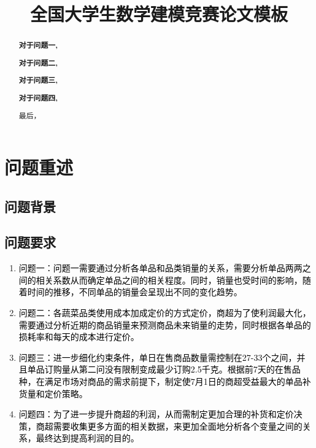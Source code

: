 \documentclass[withoutpreface,bwprint]{cumcmthesis}
\title{全国大学生数学建模竞赛论文模板}  %
\begin{document}
\maketitle
\begin{abstract}
\textbf{对于问题一,}

\textbf{对于问题二,}

\textbf{对于问题三,}

\textbf{对于问题四,}

最后，



\end{abstract}

\tableofcontents  %
\newpage

\section{问题重述}
\subsection{问题背景}
% 

\subsection{问题要求}
\begin{enumerate}
  \item \textcolor{black}{问题一：问题一需要通过分析各单品和品类销量的关系，需要分析单品两两之间的相关系数从而确定单品之间的相关程度。同时，销量也受时间的影响，随着时间的推移，不同单品的销量会呈现出不同的变化趋势。}
  \item \textcolor{black}{问题二：各蔬菜品类使用成本加成定价的方式定价，商超为了使利润最大化，需要通过分析近期的商品销量来预测商品未来销量的走势，同时根据各单品的损耗率和每天的成本进行定价。}
    \item \textcolor{black}{问题三：进一步细化约束条件，单日在售商品数量需控制在27-33个之间，并且单品订购量从第二问没有限制变成最少订购2.5千克。根据前7天的在售品种，在满足市场对商品的需求前提下，制定使7月1日的商超受益最大的单品补货量和定价策略。}
      \item \textcolor{black}{问题四：为了进一步提升商超的利润，从而需制定更加合理的补货和定价决策，商超需要收集更多方面的相关数据，来更加全面地分析各个变量之间的关系，最终达到提高利润的目的。}
\end{enumerate}
\end{document}
